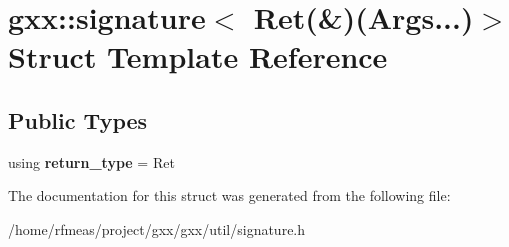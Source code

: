 \hypertarget{structgxx_1_1signature_3_01Ret_07_6_08_07Args_8_8_8_08_4}{}\section{gxx\+:\+:signature$<$ Ret(\&)(Args...)$>$ Struct Template Reference}
\label{structgxx_1_1signature_3_01Ret_07_6_08_07Args_8_8_8_08_4}
\subsection*{Public Types}
\begin{DoxyCompactItemize}
\item 
using {\bfseries return\+\_\+type} = Ret\hypertarget{structgxx_1_1signature_3_01Ret_07_6_08_07Args_8_8_8_08_4_a4a33bb8627c035a92c6ae0d1862b460e}{}\label{structgxx_1_1signature_3_01Ret_07_6_08_07Args_8_8_8_08_4_a4a33bb8627c035a92c6ae0d1862b460e}

\end{DoxyCompactItemize}


The documentation for this struct was generated from the following file\+:\begin{DoxyCompactItemize}
\item 
/home/rfmeas/project/gxx/gxx/util/signature.\+h\end{DoxyCompactItemize}
